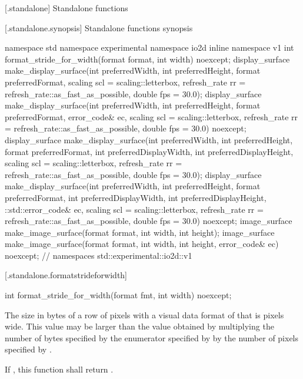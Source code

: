  [\iotwod.standalone] {Standalone functions}

 [\iotwod.standalone.synopsis] {Standalone functions synopsis}

\begin{codeblock}
namespace std { namespace experimental { namespace io2d { inline namespace v1 {
  int format_stride_for_width(format format, int width) noexcept;
  display_surface make_display_surface(int preferredWidth,
    int preferredHeight, format preferredFormat,
    scaling scl = scaling::letterbox,
    refresh_rate rr = refresh_rate::as_fast_as_possible, double fps = 30.0);
  display_surface make_display_surface(int preferredWidth,
    int preferredHeight, format preferredFormat, error_code& ec,
    scaling scl = scaling::letterbox,
    refresh_rate rr = refresh_rate::as_fast_as_possible, double fps = 30.0) noexcept;
  display_surface make_display_surface(int preferredWidth,
    int preferredHeight, format preferredFormat, int preferredDisplayWidth, 
    int preferredDisplayHeight, scaling scl = scaling::letterbox,
    refresh_rate rr = refresh_rate::as_fast_as_possible, double fps = 30.0);
  display_surface make_display_surface(int preferredWidth,
    int preferredHeight, format preferredFormat, int preferredDisplayWidth, 
    int preferredDisplayHeight, ::std::error_code& ec,
    scaling scl = scaling::letterbox,
    refresh_rate rr = refresh_rate::as_fast_as_possible, double fps = 30.0) noexcept;
  image_surface make_image_surface(format format, int width, int height);
  image_surface make_image_surface(format format, int width, int height, 
    error_code& ec) noexcept;
} } } } // namespaces std::experimental::io2d::v1
\end{codeblock}

 [\iotwod.standalone.formatstrideforwidth] {}

\begin{itemdecl}
int format_stride_for_width(format fmt, int width) noexcept;
\end{itemdecl}
\begin{itemdescr}
\pnum
\returns
The size in bytes of a row of pixels with a visual data format of  that is  pixels wide. This value may be larger than the value obtained by multiplying the number of bytes specified by the  enumerator specified by  by the number of pixels specified by .

\pnum
If , this function shall return .
\end{itemdescr}


